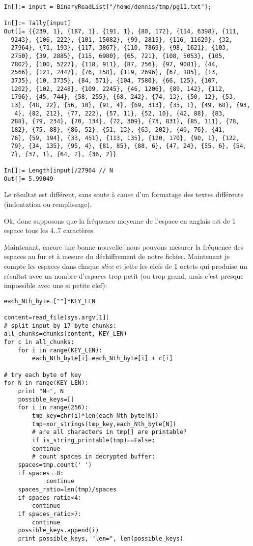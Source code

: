 \begin{lstlisting}[caption=Mathematica,style=custommath]
In[]:= input = BinaryReadList["/home/dennis/tmp/pg11.txt"];

In[]:= Tally[input]
Out[]= {{239, 1}, {187, 1}, {191, 1}, {80, 172}, {114, 6398}, {111, 
  9243}, {106, 222}, {101, 15082}, {99, 2815}, {116, 11629}, {32, 
  27964}, {71, 193}, {117, 3867}, {110, 7869}, {98, 1621}, {103, 
  2750}, {39, 2885}, {115, 6980}, {65, 721}, {108, 5053}, {105, 
  7802}, {100, 5227}, {118, 911}, {87, 256}, {97, 9081}, {44, 
  2566}, {121, 2442}, {76, 158}, {119, 2696}, {67, 185}, {13, 
  3735}, {10, 3735}, {84, 571}, {104, 7580}, {66, 125}, {107, 
  1202}, {102, 2248}, {109, 2245}, {46, 1206}, {89, 142}, {112, 
  1796}, {45, 744}, {58, 255}, {68, 242}, {74, 13}, {50, 12}, {53, 
  13}, {48, 22}, {56, 10}, {91, 4}, {69, 313}, {35, 1}, {49, 68}, {93,
   4}, {82, 212}, {77, 222}, {57, 11}, {52, 10}, {42, 88}, {83, 
  288}, {79, 234}, {70, 134}, {72, 309}, {73, 831}, {85, 111}, {78, 
  182}, {75, 88}, {86, 52}, {51, 13}, {63, 202}, {40, 76}, {41, 
  76}, {59, 194}, {33, 451}, {113, 135}, {120, 170}, {90, 1}, {122, 
  79}, {34, 135}, {95, 4}, {81, 85}, {88, 6}, {47, 24}, {55, 6}, {54, 
  7}, {37, 1}, {64, 2}, {36, 2}}

In[]:= Length[input]/27964 // N
Out[]= 5.99049
\end{lstlisting}

Le résultat est différent, sans soute à cause d'un formatage des textes différents
(indentation ou remplissage).

Ok, donc supposons que la fréquence moyenne de l'espace en anglais est de 1 espace
tous les 4..7 caractères.

Maintenant, encore une bonne nouvelle: nous pouvons mesurer la fréquence des espaces
au fur et à mesure du déchiffrement de notre fichier.
Maintenant je compte les espaces dans chaque \emph{slice} et jette les clefs de 1 octets
qui produise un résultat avec un nombre d'espaces trop petit (ou trop grand, mais
c'est presque impossible avec une si petite clef):

\begin{lstlisting}[caption=Python script,style=custompy]
each_Nth_byte=[""]*KEY_LEN

content=read_file(sys.argv[1])
# split input by 17-byte chunks:
all_chunks=chunks(content, KEY_LEN)
for c in all_chunks:
    for i in range(KEY_LEN):
        each_Nth_byte[i]=each_Nth_byte[i] + c[i]

# try each byte of key
for N in range(KEY_LEN):
    print "N=", N
    possible_keys=[]
    for i in range(256):
        tmp_key=chr(i)*len(each_Nth_byte[N])
        tmp=xor_strings(tmp_key,each_Nth_byte[N])
        # are all characters in tmp[] are printable?
        if is_string_printable(tmp)==False:
	    continue
        # count spaces in decrypted buffer:
	spaces=tmp.count(' ')
	if spaces==0:
            continue
	spaces_ratio=len(tmp)/spaces
	if spaces_ratio<4:
	    continue
	if spaces_ratio>7:
	    continue
	possible_keys.append(i)
    print possible_keys, "len=", len(possible_keys)
\end{lstlisting}

